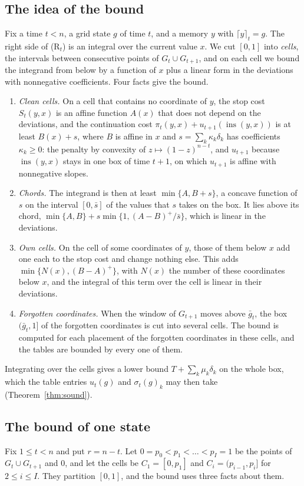 \documentclass[11pt]{amsart}
\theoremstyle{definition}
\numberwithin{equation}{section}
\newcommand{\ins}{\operatorname{ins}}
\newcommand{\ceil}[2]{\lceil #1\rceil_{#2}}
\begin{document}
\subsection{The idea of the bound}
Fix a time $t<n$, a grid state $g$ of time $t$, and a memory $y$ with $\ceil{y}{t}=g$. The right side of (R$_t$) is an integral over the current value $x$. We cut $[0,1]$ into \emph{cells}, the intervals between consecutive points of $G_t\cup G_{t+1}$, and on each cell we bound the integrand from below by a function of $x$ plus a linear form in the deviations with nonnegative coefficients. Four facts give the bound.
\begin{enumerate}[label=(\roman*)]
\item\emph{Clean cells.} On a cell that contains no coordinate of $y$, the stop cost $S_t(y,x)$ is an affine function $A(x)$ that does not depend on the deviations, and the continuation cost $\pi_t(y,x)+u_{t+1}(\ins(y,x))$ is at least $B(x)+s$, where $B$ is affine in $x$ and $s=\sum_k\kappa_k\delta_k$ has coefficients $\kappa_k\ge0$: the penalty by convexity of $z\mapsto(1-z)^{n-t}$, and $u_{t+1}$ because $\ins(y,x)$ stays in one box of time $t+1$, on which $u_{t+1}$ is affine with nonnegative slopes.
\item\emph{Chords.} The integrand is then at least $\min\{A,B+s\}$, a concave function of $s$ on the interval $[0,\bar s]$ of the values that $s$ takes on the box. It lies above its chord, $\min\{A,B\}+s\min\{1,(A-B)^+/\bar s\}$, which is linear in the deviations.
\item\emph{Own cells.} On the cell of some coordinates of $y$, those of them below $x$ add one each to the stop cost and change nothing else. This adds $\min\{N(x),(B-A)^+\}$, with $N(x)$ the number of these coordinates below $x$, and the integral of this term over the cell is linear in their deviations.
\item\emph{Forgotten coordinates.} When the window of $G_{t+1}$ moves above $\bar g_t$, the box $(\bar g_t,1]$ of the forgotten coordinates is cut into several cells. The bound is computed for each placement of the forgotten coordinates in these cells, and the tables are bounded by every one of them.
\end{enumerate}
Integrating over the cells gives a lower bound $T+\sum_k\mu_k\delta_k$ on the whole box, which the table entries $\hat u_t(g)$ and $\sigma_t(g)_k$ may then take (Theorem~\ref{thm:sound}).

\subsection{The bound of one state}\label{sec:bound}
Fix $1\le t<n$ and put $r=n-t$. Let $0=p_0<p_1<\dots<p_I=1$ be the points of $G_t\cup G_{t+1}$ and $0$, and let the cells be $C_1=[0,p_1]$ and $C_i=(p_{i-1},p_i]$ for $2\le i\le I$. They partition $[0,1]$, and the bound uses three facts about them.
\end{document}
